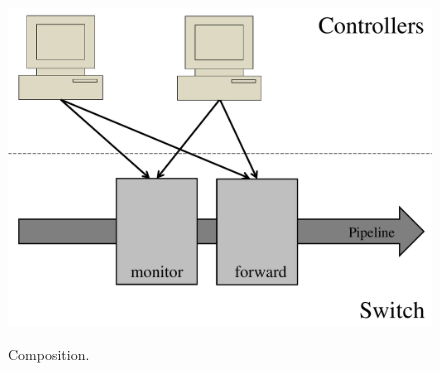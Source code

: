 \documentclass[conference]{sigcomm-alternate}
\begin{document}
\begin{figure}[t]
\centering
\includegraphics[width=0.8\columnwidth]{composition.pdf}\\
\caption{Composition.}\label{fig:illu}
\end{figure}
\end{document}
